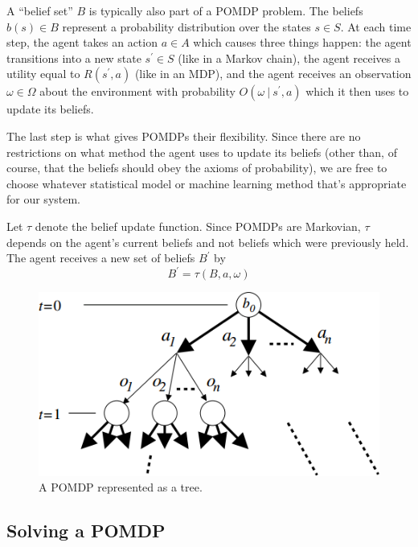 \documentclass[tog]{acmsiggraph}
\newcommand{\given}[1][]{\:#1\vert\:}
\begin{document}
A ``belief set'' $B$ is typically also part of a POMDP problem. The beliefs $b \left( s \right) \in B$ 
represent a probability distribution over the states $s \in S$. At each time step, 
the agent takes an action $a \in A$ which causes three things happen: the agent transitions 
into a new state $s^\prime \in S$ (like in a Markov chain), the agent receives a utility equal to 
$R \left( s^\prime, a \right)$ (like in an MDP), %
and the agent receives an observation $\omega \in \Omega$ about the environment with probability 
$O \left( \omega \given s^\prime, a \right)$ which it then uses to update its beliefs.

The last step is what gives POMDPs their flexibility. Since there are no restrictions on what method 
the agent uses to update its beliefs (other than, of course, that the beliefs should obey the axioms 
of probability), we are free to choose whatever statistical model or machine learning method that's 
appropriate for our system.

Let $\tau$ denote the belief update function. Since POMDPs are Markovian, $\tau$ depends on the 
agent's current beliefs and not beliefs which were previously held. The agent receives a new set 
of beliefs $B^\prime$ by
\begin{equation*}
  B^\prime = \tau \left( B, a, \omega \right)
\end{equation*}

\begin{figure}[h]
  \centering
  \includegraphics[scale=0.4]{POMDPtree.png}
  \caption{A POMDP represented as a tree.~\protect\cite{smith2004heuristic}}
  \label{fig:POMDPtree}
\end{figure}

\subsection{Solving a POMDP}
\end{document}
